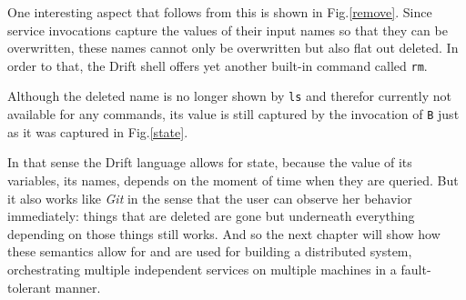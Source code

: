 One interesting aspect that follows from this is shown in Fig.\ref{remove}.
Since service invocations capture the values of their input names
so that they can be overwritten, these names cannot only
be overwritten but also flat out deleted. In order to that, the
Drift shell offers yet another built-in command called \texttt{rm}.

Although the deleted name is no longer shown by \texttt{ls} and
therefor currently not available for any commands, its value is
still captured by the invocation of \texttt{B} just as it was
captured in Fig.\ref{state}.

In that sense the Drift language allows for state, because the value
of its variables, its names, depends on the moment of time when they
are queried. But it also works like \textit{Git} in the sense that
the user can observe her behavior immediately: things that are deleted
are gone but underneath everything depending on those things still
works.
And so the next chapter will show how these semantics allow for
and are used for building a distributed system, orchestrating
multiple independent services on multiple machines in a fault-tolerant
manner.


